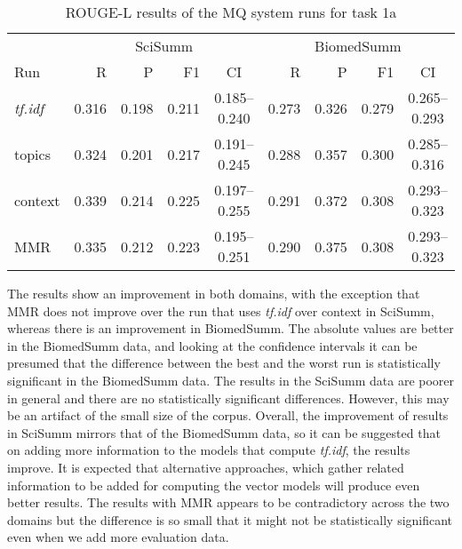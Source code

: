 \documentclass[11pt]{article}
\begin{document}
\begin{table*}
  \centering
  \begin{tabular}{l|rrrc|rrrc}
& \multicolumn{4}{|c|}{SciSumm} & \multicolumn{4}{c}{BiomedSumm}\\
Run & R & P & F1 & CI & R & P & F1 & CI\\
\hline
    \emph{tf.idf} & 0.316 & 0.198 & 0.211 & 0.185--0.240 & 0.273 &
    0.326 & 0.279 & 0.265--0.293\\
topics & 0.324 & 0.201 & 0.217 & 0.191--0.245 & 0.288 & 0.357 & 0.300
& 0.285--0.316\\
context & 0.339 & 0.214 & 0.225 & 0.197--0.255 & 0.291 & 0.372 & 0.308
& 0.293--0.323\\
MMR & 0.335 & 0.212 & 0.223 & 0.195--0.251 &  0.290 & 0.375 & 0.308 & 0.293--0.323\\ 
  \end{tabular}
  \caption{ROUGE-L results of the MQ system runs for task 1a}
  \label{tab:task1a}
\end{table*}

The results show an improvement in both domains, with the exception that MMR does not improve over the run that uses
\emph{tf.idf} over context in SciSumm, whereas there is an improvement in BiomedSumm. The absolute values are better in the BiomedSumm data, and looking at the confidence intervals it can be presumed that the difference between the best and the worst run is statistically significant in the BiomedSumm data. The results in the SciSumm data are poorer in general and there are no statistically significant differences. However, this may be an artifact of the small size of the corpus. Overall, the improvement of results in SciSumm mirrors that of the BiomedSumm data, so it can be suggested that on adding more information to the models that compute \emph{tf.idf}, the results improve. It is expected that alternative approaches, which gather related information to be added for computing the vector models will produce even better results. The results with MMR appears to be contradictory across the two domains but the difference is so small that it might not be statistically significant even when we add more evaluation data.
\end{document}
